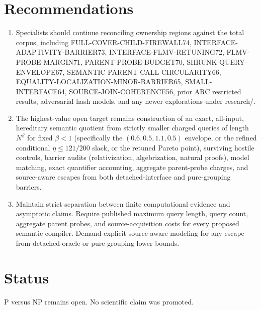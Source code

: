 \documentclass[11pt]{article}
\begin{document}
\section{Recommendations}
\begin{enumerate}
\item Specialists should continue reconciling ownership regions against the total corpus, including FULL-COVER-CHILD-FIREWALL74, INTERFACE-ADAPTIVITY-BARRIER73, INTERFACE-FLMV-RETUNING72, FLMV-PROBE-MARGIN71, PARENT-PROBE-BUDGET70, SHRUNK-QUERY-ENVELOPE67, SEMANTIC-PARENT-CALL-CIRCULARITY66, EQUALITY-LOCALIZATION-MINOR-BARRIER65, SMALL-INTERFACE64, SOURCE-JOIN-COHERENCE56, prior ARC restricted results, adversarial hash models, and any newer explorations under research/.
\item The highest-value open target remains construction of an exact, all-input, hereditary semantic quotient from strictly smaller charged queries of length $N^\beta$ for fixed $\beta<1$ (specifically the $(0.6,0.5,1.1,0.5)$ envelope, or the refined conditional $\eta\le 121/200$ slack, or the retuned Pareto point), surviving hostile controls, barrier audits (relativization, algebrization, natural proofs), model matching, exact quantifier accounting, aggregate parent-probe charges, and source-aware escapes from both detached-interface and pure-grouping barriers.
\item Maintain strict separation between finite computational evidence and asymptotic claims. Require published maximum query length, query count, aggregate parent probes, and source-acquisition costs for every proposed semantic compiler. Demand explicit source-aware modeling for any escape from detached-oracle or pure-grouping lower bounds.
\end{enumerate}

\section{Status}
P versus NP remains open. No scientific claim was promoted.

\end{document}
